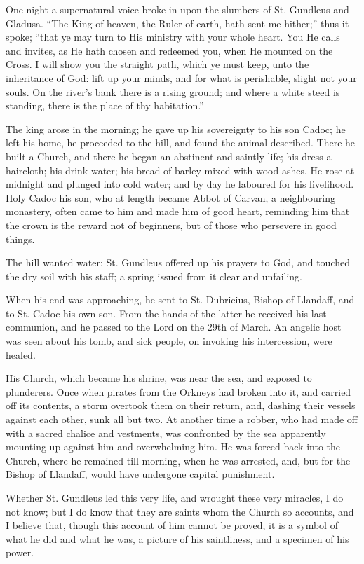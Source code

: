One night a supernatural voice broke in upon the
slumbers of St. Gundleus and Gladusa. ``The King of heaven, the Ruler
of earth, hath sent me hither;'' thus it spoke; ``that ye may turn to
His ministry with your whole heart. You He calls and invites, as He
hath chosen and redeemed you, when He mounted on the Cross. I will
show you the straight path, which ye must keep, unto the inheritance
of God: lift up your minds, and for what is perishable, slight not
your souls. On the river's bank there is a rising ground; and where a
white steed is standing, there is the place of thy habitation.''

The king arose in the morning; he gave up his
sovereignty to his son Cadoc; he left his home, he proceeded to the
hill, and found the animal described. There he built a Church, and
there he began an abstinent and saintly life; his dress a haircloth;
his drink water; his bread of barley mixed with wood ashes. He rose at
midnight and plunged into cold water; and by day he laboured for his
livelihood. Holy Cadoc his son, who at length became Abbot of Carvan,
a neighbouring monastery, often came to him and made him of good
heart, reminding him that the crown is the reward not of
beginners, but of those who persevere in good things.

The hill wanted water; St. Gundleus offered up
his prayers to God, and touched the dry soil with his staff; a spring
issued from it clear and unfailing.

When his end was approaching, he sent to St.
Dubricius, Bishop of Llandaff, and to St. Cadoc his own son. From the
hands of the latter he received his last communion, and he passed to
the Lord on the 29th of March. An angelic host was seen about his
tomb, and sick people, on invoking his intercession, were healed.

His Church, which became his shrine, was near the
sea, and exposed to plunderers. Once when pirates from the Orkneys had
broken into it, and carried off its contents, a storm overtook them on
their return, and, dashing their vessels against each other, sunk all
but two. At another time a robber, who had made off with a sacred
chalice and vestments, was confronted by the sea apparently mounting
up against him and overwhelming him. He was forced back into the
Church, where he remained till morning, when he was arrested, and, but
for the Bishop of Llandaff, would have undergone capital punishment.

Whether St. Gundleus led this very life, and
wrought these very miracles, I do not know; but I do know that they
are saints whom the Church so accounts, and I believe that, though
this account of him cannot be proved, it is a symbol of what he did
and what he was, a picture of his saintliness, and a specimen of his
power.

